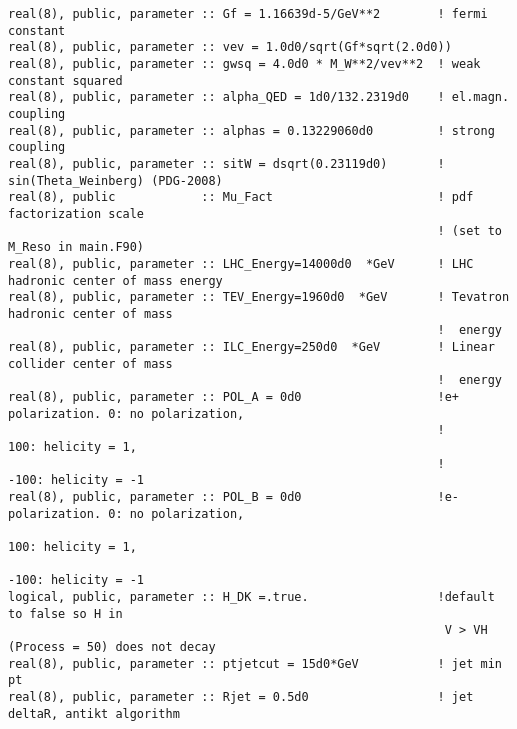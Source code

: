 \documentclass[aps,superscriptaddress,nofootinbib]{revtex4}
\begin{document}
\begin{verbatim}
real(8), public, parameter :: Gf = 1.16639d-5/GeV**2        ! fermi constant
real(8), public, parameter :: vev = 1.0d0/sqrt(Gf*sqrt(2.0d0))
real(8), public, parameter :: gwsq = 4.0d0 * M_W**2/vev**2  ! weak constant squared
real(8), public, parameter :: alpha_QED = 1d0/132.2319d0    ! el.magn. coupling
real(8), public, parameter :: alphas = 0.13229060d0         ! strong coupling
real(8), public, parameter :: sitW = dsqrt(0.23119d0)       ! sin(Theta_Weinberg) (PDG-2008)
real(8), public            :: Mu_Fact                       ! pdf factorization scale
                                                            ! (set to M_Reso in main.F90)
real(8), public, parameter :: LHC_Energy=14000d0  *GeV      ! LHC hadronic center of mass energy
real(8), public, parameter :: TEV_Energy=1960d0  *GeV       ! Tevatron hadronic center of mass
                                                            !  energy
real(8), public, parameter :: ILC_Energy=250d0  *GeV        ! Linear collider center of mass
                                                            !  energy
real(8), public, parameter :: POL_A = 0d0                   !e+ polarization. 0: no polarization,
                                                            !                 100: helicity = 1,
                                                            !                -100: helicity = -1
real(8), public, parameter :: POL_B = 0d0                   !e- polarization. 0: no polarization,
                                                                              100: helicity = 1,
                                                                              -100: helicity = -1
logical, public, parameter :: H_DK =.true.                  !default to false so H in
                                                             V > VH (Process = 50) does not decay
real(8), public, parameter :: ptjetcut = 15d0*GeV           ! jet min pt
real(8), public, parameter :: Rjet = 0.5d0                  ! jet deltaR, antikt algorithm
\end{verbatim}
\end{document}
